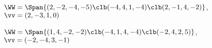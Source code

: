 \begin{exercise}
\begin{parts}
\item \(\WW=\Span\{(2,-2,-4,-5)\clb(-4,4,1,-4)\clb(2,-1,4,-2)\}\), \(\vv=(2,-3,1,0)\)

\item \(\WW=\Span\{(1,4,-2,-2)\clb (-4,1,4,-4)\clb (-2,4,2,5)\}\), \(\vv=(-2,-4,3,-1)\)

%
\end{parts}  
\end{exercise}





